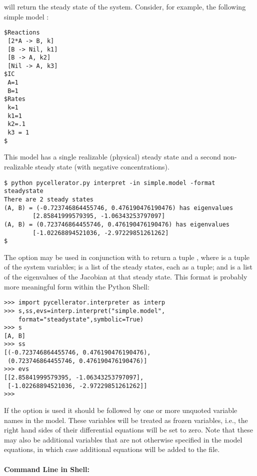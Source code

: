  will return the steady state of the system. Consider, for example, the following simple model :
\begin{lstlisting}
$Reactions
 [2*A -> B, k]
 [B -> Nil, k1]
 [B -> A, k2]
 [Nil -> A, k3]
$IC
 A=1
 B=1
$Rates
 k=1
 k1=1
 k2=.1
 k3 = 1
$
\end{lstlisting}
This model has a single realizable (physical) steady state and a second non-realizable steady state (with negative concentrations).
\begin{lstlisting}
$ python pycellerator.py interpret -in simple.model -format steadystate
There are 2 steady states
(A, B) = (-0.723746864455746, 0.476190476190476) has eigenvalues 
        [2.85841999579395, -1.06343253797097]
(A, B) = (0.723746864455746, 0.476190476190476) has eigenvalues 
        [-1.02268894521036, -2.97229851261262]
$
\end{lstlisting}

\clearpage 
The  option may be used in conjunction with  to return a tuple , where  is a tuple of the system variables;  is a list of the steady states, each as a tuple; and  is a list of the eigenvalues of the Jacobian at that steady state. This format is probably more meaningful form within the Python Shell: 

\begin{lstlisting}
>>> import pycellerator.interpreter as interp
>>> s,ss,evs=interp.interpret("simple.model",
    format="steadystate",symbolic=True)
>>> s
[A, B]
>>> ss
[(-0.723746864455746, 0.476190476190476), 
 (0.723746864455746, 0.476190476190476)]
>>> evs
[[2.85841999579395, -1.06343253797097], 
 [-1.02268894521036, -2.97229851261262]]
>>>
\end{lstlisting}



If the  option is used it should be followed by one or more unquoted variable names in the model. These variables will be treated as frozen variables, i.e., the right hand sides of their differential equations will be set to zero. Note that these may also be additional variables that are not otherwise specified in the model equations, in which case additional equations will be added to the file. 


\paragraph{Command Line in Shell:}\ \\

